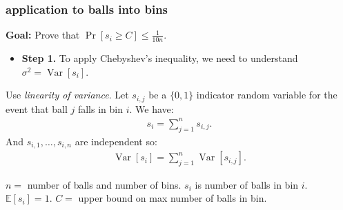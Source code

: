\documentclass[handout,compress]{beamer}
\newcommand{\E}{\mathbb{E}}
\DeclareMathOperator{\Var}{Var}
\begin{document}
%	
%	

\begin{frame}
	\frametitle{application to balls into bins}
	\textbf{Goal:} Prove that $\Pr[s_i \geq C] \leq \frac{1}{10n}$. 
	\begin{itemize}
		\item \textbf{Step 1.} To apply Chebyshev's inequality, we need to understand $\sigma^2 = \Var[s_i]$. 
	\end{itemize}
	Use \emph{linearity of variance}. Let $s_{i,j}$ be a $\{0,1\}$ indicator random variable for the event that ball $j$ falls in bin $i$. We have:
	\begin{align*}
		s_i = \sum_{j=1}^n s_{i,j}. 
	\end{align*}
	And $s_{i,1}, \ldots, s_{i,n}$ are  independent so:
	\begin{align*}
		\Var[s_i] = \sum_{j=1}^n \Var[s_{i,j}]. 
	\end{align*}
	
	\vspace{0em}
	\begin{block}{\vspace*{-3ex}}
		\small $n = $ number of balls and number of bins. $s_i$ is number of balls in bin $i$. $\E[s_i] = 1$. $C =$ upper bound on max number of balls in bin. 
	\end{block}
\end{frame}
\end{document}
